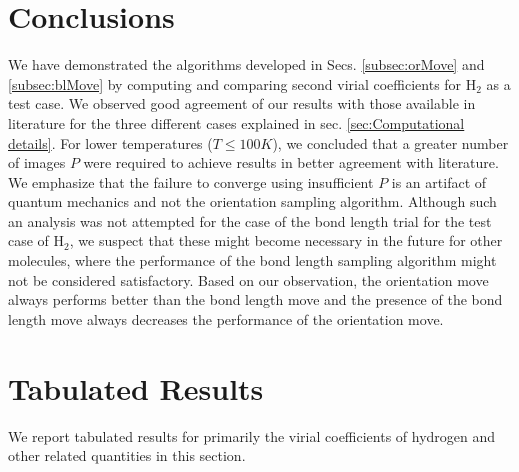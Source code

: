     \section{Conclusions}
        \label{sec:Conclusions and future work}
        We have demonstrated the algorithms developed in Secs. \ref{subsec:orMove} and \ref{subsec:blMove} by computing and comparing second virial coefficients for H$_2$ as a test case. We observed good agreement of our results with those available in literature for the three different cases explained in sec. \ref{sec:Computational details}. For lower temperatures ($T \le 100 K$), we concluded that a greater number of images $P$ were required to achieve results in better agreement with literature. We emphasize that the failure to converge using insufficient $P$ is an artifact of quantum mechanics and not the orientation sampling algorithm. Although such an analysis was not attempted for the case of the bond length trial for the test case of H$_2$, we suspect that these might become necessary in the future for other molecules, where the performance of the bond length sampling algorithm might not be considered satisfactory. Based on our observation, the orientation move always performs better than the bond length move and the presence of the bond length move always decreases the performance of the orientation move.

    \section{Tabulated Results}
    \label{sec:chap4-tables}
        We report tabulated results for primarily the virial coefficients of hydrogen and other related quantities in this section.
        
